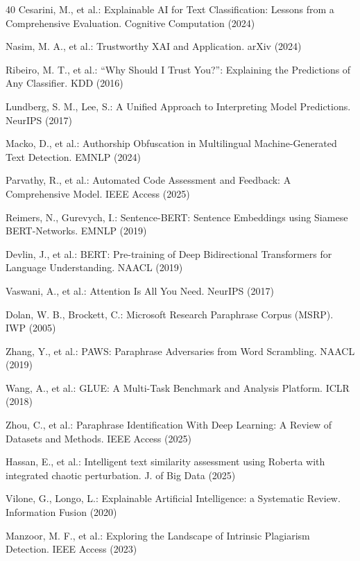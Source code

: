 \documentclass[pdflatex,sn-basic]{sn-jnl}
\begin{document}
\begin{thebibliography}{40}
Cesarini, M., et al.: Explainable AI for Text Classification: Lessons from a Comprehensive Evaluation. Cognitive Computation (2024)

Nasim, M. A., et al.: Trustworthy XAI and Application. arXiv (2024)

Ribeiro, M. T., et al.: ``Why Should I Trust You?'': Explaining the Predictions of Any Classifier. KDD (2016)

Lundberg, S. M., Lee, S.: A Unified Approach to Interpreting Model Predictions. NeurIPS (2017)

Macko, D., et al.: Authorship Obfuscation in Multilingual Machine-Generated Text Detection. EMNLP (2024)

Parvathy, R., et al.: Automated Code Assessment and Feedback: A Comprehensive Model. IEEE Access (2025)

Reimers, N., Gurevych, I.: Sentence-BERT: Sentence Embeddings using Siamese BERT-Networks. EMNLP (2019)

Devlin, J., et al.: BERT: Pre-training of Deep Bidirectional Transformers for Language Understanding. NAACL (2019)

Vaswani, A., et al.: Attention Is All You Need. NeurIPS (2017)

Dolan, W. B., Brockett, C.: Microsoft Research Paraphrase Corpus (MSRP). IWP (2005)

Zhang, Y., et al.: PAWS: Paraphrase Adversaries from Word Scrambling. NAACL (2019)

Wang, A., et al.: GLUE: A Multi-Task Benchmark and Analysis Platform. ICLR (2018)

Zhou, C., et al.: Paraphrase Identification With Deep Learning: A Review of Datasets and Methods. IEEE Access (2025)

Hassan, E., et al.: Intelligent text similarity assessment using Roberta with integrated chaotic perturbation. J. of Big Data (2025)

Vilone, G., Longo, L.: Explainable Artificial Intelligence: a Systematic Review. Information Fusion (2020)

Manzoor, M. F., et al.: Exploring the Landscape of Intrinsic Plagiarism Detection. IEEE Access (2023)


\end{thebibliography}
\end{document}
